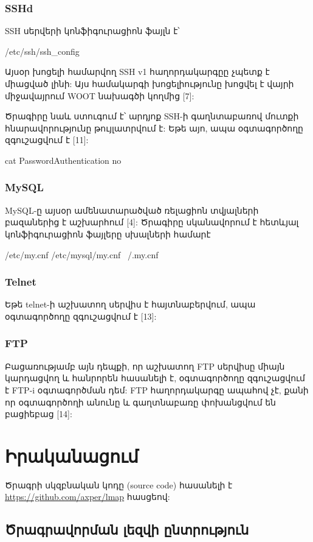 \documentclass[a4paper,12pt]{article}
\begin{document}
\begin{sloppypar}
\subsubsection{SSHd}

SSH սերվերի կոնֆիգուրացիոն ֆայլն է՝

    /etc/ssh/ssh\_config

Այսօր խոցելի համարվող SSH v1 հաղորդակարգըը չպետք է միացված լինի:
Այս համակարգի խոցելիությունը խոցվել է վայրի միջավայրում WOOT
նախագծի կողմից [7]:

Ծրագիրը նաև ստուգում է՝ արդյոք SSH-ի գաղնտաբառով մուտքի
հնարավորությունը թույլատրվում է: Եթե այո, ապա օգտագործողը
զգուշացվում է [11]:

    cat PasswordAuthentication no

\subsubsection{MySQL}

MySQL-ը այսօր ամենատարածված ռելացիոն տվյալների բազաներից է աշխարհում [4]:
Ծրագիրը սկանավորում է հետևյալ կոնֆիգուրացիոն ֆայլերը սխալների համարէ

    /etc/my.cnf
    /etc/mysql/my.cnf
    ~/.my.cnf

\subsubsection{Telnet}

Եթե telnet-ի աշխատող սերվիս է հայտնաբերվում, ապա օգտագործողը զգուշացվում է [13]:

\subsubsection{FTP}

Բացառությամբ այն դեպքի, որ աշխատող FTP սերվիսը միայն կարդացվող և
հանրորեն հասանելի է, օգտագործողը զգուշացվում է FTP-i օգտագործման դեմ:
FTP հաղորդակարգը ապահով չէ, քանի որ օգտագործողի անունը և
գաղտնաբառը փոխանցվում են բացիեբաց [14]:


\section{Իրականացում}


Ծրագրի սկզբնական կոդը (source code) հասանելի է \url{https://github.com/axper/lmap} հասցեով:


\subsection{Ծրագրավորման լեզվի ընտրություն}



\end{sloppypar}
\end{document}
